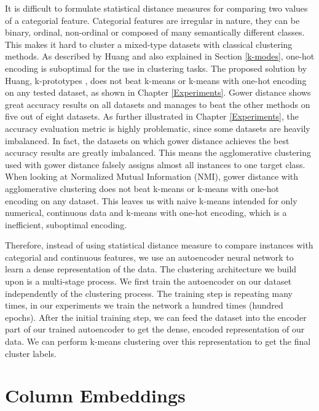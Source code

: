 It is difficult to formulate statistical distance measures for comparing two values of a categorial feature. Categorial features are irregular in nature, they can be binary, ordinal, non-ordinal or composed of many semantically different classes. This makes it hard to cluster a mixed-type datasets with classical clustering methods. As described by Huang \cite{kmodes} and also explained in Section \ref{k-modes}, one-hot encoding is suboptimal for the use in clustering tasks. The proposed solution by Huang, k-prototypes \cite{kmodes}, does not beat k-means or k-means with one-hot encoding on any tested dataset, as shown in Chapter \ref{Experiments}. Gower distance shows great accuracy results on all datasets and manages to beat the other methods on five out of eight datasets. As further illustrated in Chapter \ref{Experiments}, the accuracy evaluation metric is highly problematic, since some datasets are heavily imbalanced. In fact, the datasets on which gower distance achieves the best accuracy results are greatly imbalanced. This means the agglomerative clustering used with gower distance falsely assigns almost all instances to one target class. When looking at Normalized Mutual Information (NMI), gower distance with agglomerative clustering does not beat k-means or k-means with one-hot encoding on any dataset. This leaves us with naive k-means intended for only numerical, continuous data and k-means with one-hot encoding, which is a inefficient, suboptimal encoding.

Therefore, instead of using statistical distance measure to compare instances with categorial and continuous features, we use an autoencoder neural network to learn a dense representation of the data. The clustering architecture we build upon is a multi-stage process. We first train the autoencoder on our dataset independently of the clustering process. The training step is repeating many times, in our experiments we train the network a hundred times (hundred epochs). After the initial training step, we can feed the dataset into the encoder part of our trained autoencoder to get the dense, encoded representation of our data. We can perform k-means clustering over this representation to get the final cluster labels.

\section{Column Embeddings}

